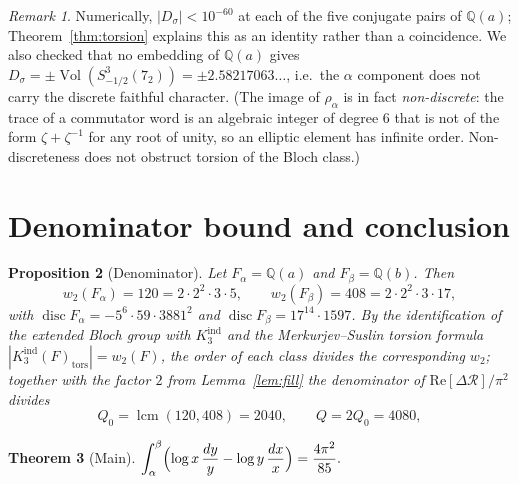 \documentclass[11pt]{article}
\newtheorem{theorem}{Theorem}
\newtheorem{proposition}[theorem]{Proposition}
\theoremstyle{remark}
\newtheorem{remark}[theorem]{Remark}
\DeclareMathOperator{\Vol}{Vol}
\newcommand{\QQ}{\mathbb{Q}}
\begin{document}
\begin{remark}
Numerically, $|D_\sigma|<10^{-60}$ at each of the five conjugate pairs of
$\QQ(a)$; Theorem~\ref{thm:torsion} explains this as an identity rather than a
coincidence. We also checked that no embedding of $\QQ(a)$ gives
$D_\sigma=\pm\Vol(S^3_{-1/2}(7_2))=\pm2.58217063\ldots$, i.e.\ the $\alpha$
component does not carry the discrete faithful character. (The image of
$\rho_\alpha$ is in fact \emph{non-discrete}: the trace of a commutator word is
an algebraic integer of degree $6$ that is not of the form
$\zeta+\zeta^{-1}$ for any root of unity, so an elliptic element has infinite
order. Non-discreteness does not obstruct torsion of the Bloch class.)
\end{remark}

\section{Denominator bound and conclusion}

\begin{proposition}[Denominator]\label{prop:denom}
Let $F_\alpha=\QQ(a)$ and $F_\beta=\QQ(b)$. Then
\[
w_2(F_\alpha)=120=2\cdot2^2\cdot3\cdot5,\qquad
w_2(F_\beta)=408=2\cdot2^2\cdot3\cdot17,
\]
with $\operatorname{disc}F_\alpha=-5^6\cdot59\cdot3881^2$ and
$\operatorname{disc}F_\beta=17^{14}\cdot1597$. By the identification of the
extended Bloch group with $K_3^{\mathrm{ind}}$ and the Merkurjev--Suslin torsion
formula $|K_3^{\mathrm{ind}}(F)_{\mathrm{tors}}|=w_2(F)$, the order of each
class divides the corresponding $w_2$; together with the factor $2$ from
Lemma~\ref{lem:fill} the denominator of
$\mathrm{Re}[\Delta\mathcal R]/\pi^2$ divides
\[
Q_0=\operatorname{lcm}(120,408)=2040,\qquad Q=2Q_0=4080,
\]
\end{proposition}

\begin{theorem}[Main]\label{thm:main}
$\displaystyle
\int_\alpha^\beta\Bigl(\log x\,\frac{dy}{y}-\log y\,\frac{dx}{x}\Bigr)
=\frac{4\pi^2}{85}.$
\end{theorem}
\end{document}
